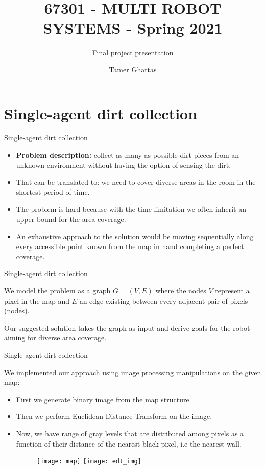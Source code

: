 \documentclass[10pt]{beamer}
\title{67301 - MULTI ROBOT SYSTEMS - Spring 2021}
\subtitle{Final project presentation}
\date{}
\author{Tamer Ghattas}
\institute{
The Hebrew University of Jerusalem School of Computer Science and Engineering
}
\begin{document}
\maketitle


\section{Single-agent dirt collection}

\begin{frame}{Single-agent dirt collection}
\begin{itemize}
    \item {\bf Problem description:} collect as many as possible dirt pieces from an unknown environment without having the option of sensing the dirt. 
    \item That can be translated to: we need to cover diverse areas in the room in the shortest period of time.
    \item The problem is hard because with the time limitation we often inherit an upper bound for the area coverage.
    \item An exhaustive approach to the solution would be moving sequentially along every accessible point known from the map in hand completing a perfect coverage.
\end{itemize}
\end{frame}


\begin{frame}{Single-agent dirt collection}

We model the problem as a graph $G=(V, E)$ where the nodes $V$ represent a pixel in the map and $E$ an edge existing between every adjacent pair of pixels (nodes).


\bigskip


Our suggested solution takes the graph as input and derive goals for the robot aiming for diverse area coverage.
\end{frame}


\begin{frame}{Single-agent dirt collection}

We implemented our approach using image processing manipulations on the given map:
\graphicspath{{images/}}
\begin{itemize}
    \item First we generate binary image from the map structure.
    \item Then we perform Euclidean Distance Transform on the image.
    \item Now, we have range of gray levels that are distributed among pixels as a function of their distance of the nearest black pixel, i.e the nearest wall.
    \bigskip
    
    \begin{figure}[htp]
    \centering
    \texttt{[image: map]}
    \texttt{[image: edt\_img]}

    \label{fig:galaxy}
\end{figure}
    
\end{itemize}
\end{frame}
\end{document}
